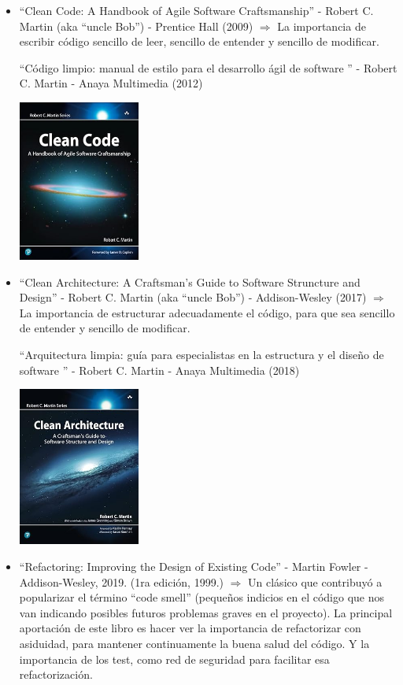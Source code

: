 \documentclass[spanish,12pt,a4paper,final,oneside]{book}
\begin{document}
\begin{itemize}
\item ``Clean Code: A Handbook of Agile Software Craftsmanship'' - Robert C. Martin (aka ``uncle Bob'') - Prentice Hall (2009) $\Rightarrow$ La importancia de escribir código sencillo de leer, sencillo de entender y sencillo de modificar.

``Código limpio: manual de estilo para el desarrollo ágil de software '' - Robert C. Martin - Anaya Multimedia (2012)

\includegraphics[width=4cm]{portada-CleanCode-RobertCMartin.jpg} 

\item ``Clean Architecture: A Craftsman's Guide to Software Struncture and Design'' - Robert C. Martin (aka ``uncle Bob'') - Addison-Wesley (2017) $\Rightarrow$ La importancia de estructurar adecuadamente el código, para que sea sencillo de entender y sencillo de modificar.

``Arquitectura limpia: guía para especialistas en la estructura y el diseño de software '' - Robert C. Martin - Anaya Multimedia (2018)

\includegraphics[width=4cm]{portada-CleanArchitecture-RoberCMartin.jpg} 

\item ``Refactoring: Improving the Design of Existing Code'' - Martin Fowler - Addison-Wesley, 2019. (1ra edición, 1999.) $\Rightarrow$ Un clásico que contribuyó a popularizar el término ``code smell'' (pequeños indicios en el código que nos van indicando posibles futuros problemas graves en el proyecto). La principal aportación de este libro es hacer ver la importancia de refactorizar con asiduidad, para mantener continuamente la buena salud del código. Y la importancia de los test, como red de seguridad para facilitar esa refactorización.


\end{itemize}
\end{document}
